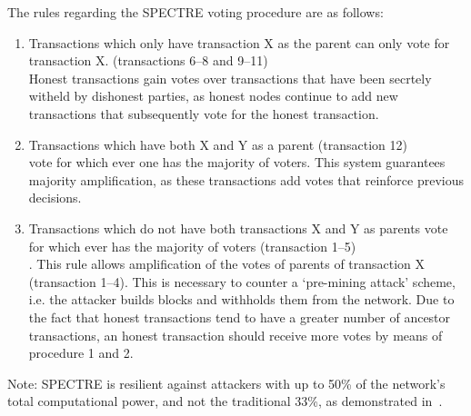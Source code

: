 \documentclass[a4paper,10pt,twocolumn]{article}
\begin{document}
 The rules regarding the SPECTRE voting procedure are as follows:

 \vspace{-0.5\baselineskip}
 \begin{enumerate}
	 \setlength\itemsep{0em}
\item Transactions which only have transaction X as the parent can only vote for transaction X. (transactions 6--8 and 9--11) \\
Honest transactions gain votes over transactions that have been secrtely witheld by dishonest parties, as honest nodes continue to add 
new transactions that subsequently vote for the honest transaction.
 \item Transactions which have both X and Y as a parent (transaction 12)\\ vote for which ever one has the majority of voters.
This system guarantees majority amplification, as these transactions add votes that reinforce previous decisions. 
 \item  Transactions which do not have both transactions X and Y as parents vote for which ever has the majority of voters (transaction 
 1--5)\\.
 This rule allows amplification of the votes of parents of transaction X (transaction 1--4). This is necessary to counter a `pre-mining 
 attack' scheme, i.e. the attacker builds blocks and withholds them from the network. Due to the fact that honest transactions tend to 
 have a greater number of ancestor transactions, an honest transaction should receive more votes by means of procedure 1 and 2.
 \end{enumerate}

Note: SPECTRE is resilient against attackers with up to 50\% of the network's total computational power, and not the traditional 33\%, 
as demonstrated in~\cite{spectre}.
\end{document}

